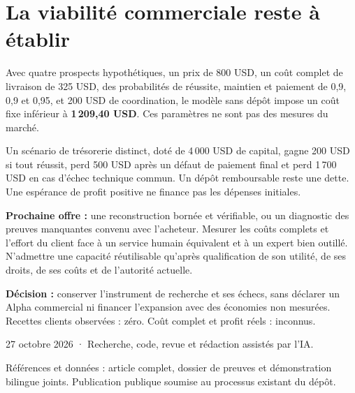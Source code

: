 \documentclass[10pt]{article}
\begin{document}
\section*{La viabilité commerciale reste à établir}

Avec quatre prospects hypothétiques, un prix de 800 USD, un coût complet de livraison de 325 USD, des probabilités de réussite, maintien et paiement de 0,9, 0,9 et 0,95, et 200 USD de coordination, le modèle sans dépôt impose un coût fixe inférieur à \textbf{1\,209,40 USD}. Ces paramètres ne sont pas des mesures du marché.

Un scénario de trésorerie distinct, doté de 4\,000 USD de capital, gagne 200 USD si tout réussit, perd 500 USD après un défaut de paiement final et perd 1\,700 USD en cas d'échec technique commun. Un dépôt remboursable reste une dette. Une espérance de profit positive ne finance pas les dépenses initiales.

\textbf{Prochaine offre :} une reconstruction bornée et vérifiable, ou un diagnostic des preuves manquantes convenu avec l'acheteur. Mesurer les coûts complets et l'effort du client face à un service humain équivalent et à un expert bien outillé. N'admettre une capacité réutilisable qu'après qualification de son utilité, de ses droits, de ses coûts et de l'autorité actuelle.

\textbf{Décision :} conserver l'instrument de recherche et ses échecs, sans déclarer un Alpha commercial ni financer l'expansion avec des économies non mesurées. Recettes clients observées : zéro. Coût complet et profit réels : inconnus.

\vfill
{\footnotesize\color{teal}27 octobre 2026 · Recherche, code, revue et rédaction assistés par l'IA.\par
Références et données : article complet, dossier de preuves et démonstration bilingue joints. Publication publique soumise au processus existant du dépôt.}
\end{document}
